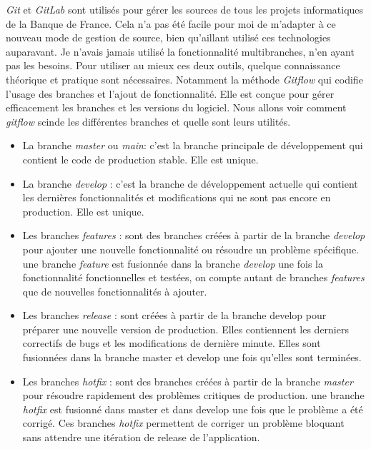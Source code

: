 \documentclass{report}
\begin{document}
 \textit{Git} et \textit{GitLab} sont utilisés pour gérer les sources de tous les projets informatiques de la Banque de France.    
Cela n'a pas été facile pour moi de m'adapter à ce nouveau mode de gestion de source, bien qu'aillant utilisé ces technologies auparavant. Je n'avais jamais utilisé la fonctionnalité multibranches, n'en ayant pas les besoins.
Pour utiliser au mieux ces deux outils, quelque connaissance théorique et pratique sont nécessaires. Notamment la méthode \textit{Gitflow} \cite{Gitflow} qui codifie l'usage des branches et l'ajout de fonctionnalité.
Elle est conçue pour gérer efficacement les branches et les versions du logiciel. Nous allons voir comment \textit{gitflow} scinde les différentes branches et quelle sont leurs utilités. 
\begin{itemize}
    \item La branche \textit{master} ou \textit{main}: c'est la branche principale de développement qui contient le code de production stable. Elle est unique.
    \item La branche  \textit{develop} : c'est la branche de développement actuelle qui contient les dernières fonctionnalités et modifications qui ne sont pas encore en production. Elle est unique.
    \item Les branches \textit{features} : sont des branches créées à partir de la branche \textit{develop} pour ajouter une nouvelle fonctionnalité ou résoudre un problème spécifique. une branche \textit{feature} est fusionnée dans la branche \textit{develop} une fois la fonctionnalité fonctionnelles et testées, on compte autant de branches \textit{features} que de nouvelles fonctionnalités à ajouter.
    \item Les branches \textit{release} : sont créées à partir de la branche develop pour préparer une nouvelle version de production. Elles contiennent les derniers correctifs de bugs et les modifications de dernière minute. Elles sont fusionnées dans la branche master et develop une fois qu'elles sont terminées.
    \item Les branches \textit{hotfix} : sont des branches créées à partir de la branche \textit{master} pour résoudre rapidement des problèmes critiques de production. une branche  \textit{hotfix} est fusionné dans master et dans develop une fois que le problème a été corrigé. Ces branches \textit{hotfix} permettent de corriger un problème bloquant sans attendre une itération de release de l'application.
\end{itemize}
\end{document}
